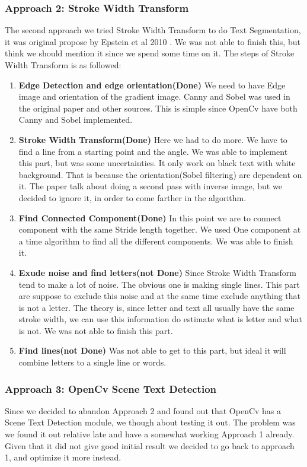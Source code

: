 \documentclass[11pt,a4paper,UKenglish]{article}
\begin{document}
\subsubsection{Approach 2: Stroke Width Transform}
The second approach we tried Stroke Width Transform to do Text Segmentation, it was original propose by Epstein et al 2010 \cite{epshtein_stroke_2010}. We was not able to finish this, but think we should mention it since we spend some time on it. The steps of Stroke Width Transform is as followed:
\begin{enumerate}
  \item \textbf{Edge Detection and edge orientation(Done)}
  We need to have Edge image and orientation of the gradient image. 
  Canny and Sobel was used in the original paper and other sources. This is simple since OpenCv have both Canny and Sobel implemented.
  \item \textbf{Stroke Width Transform(Done)}
  Here we had to do more. We have to find a line from a starting point and the angle. We was able to implement this part, but was some uncertainties. It only work on black text with white background. That is because the orientation(Sobel filtering) are dependent on it. The paper talk about doing a second pass with inverse image, but we decided to ignore it, in order to come farther in the algorithm. 
  \item \textbf{Find Connected Component(Done)}
  In this point we are to connect component with the same Stride length together. We used One component at a time algorithm to find all the different components. We was able to finish it. 
  \item \textbf{Exude noise and find letters(not Done)}
  Since Stroke Width Transform tend to make a lot of noise. The obvious one is making single lines. This part are suppose to exclude this noise and at the same time exclude anything that is not a letter. The theory is, since letter and text all usually have the same stroke width, we can use this information do estimate what is letter and what is not. We was not able to finish this part. 
  \item \textbf{Find lines(not Done)}
  Was not able to get to this part, but ideal it will combine letters to a single line or words. 
\end{enumerate}

\subsubsection{Approach 3: OpenCv Scene Text Detection}
Since we decided to abandon Approach 2 and found out that OpenCv has a Scene Text Detection module, we though about testing it out. The problem was we found it out relative late and have a somewhat working Approach 1 already. Given that it did not give good initial result we decided to go back to approach 1, and optimize it more instead. 
\end{document}
